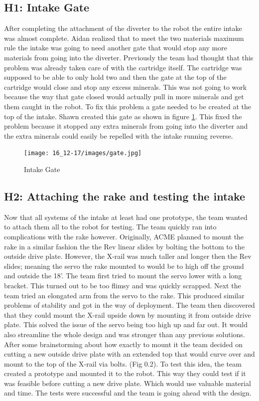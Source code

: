 \documentclass{article}
\begin{document}
\subsection{H1: Intake Gate}

After completing the attachment of the diverter to the robot the entire intake was almost complete. Aidan realized that to meet the two materials maximum rule the intake was going to need another gate that would stop any more materials from going into the diverter. Previously the team had thought that this problem was already taken care of with the cartridge itself. The cartridge was supposed to be able to only hold two and then the gate at the top of the cartridge would close and stop any excess minerals. This was not going to work because the way that gate closed would actually pull in more minerals and get them caught in the robot. To fix this problem a gate needed to be created at the top of the intake. Shawn created this gate as shown in figure \ref{fig:gate}. This fixed the problem because it stopped any extra minerals from going into the diverter and the extra minerals could easily be repelled with the intake running reverse.

\begin{figure}
    \centering
    \texttt{[image: 16\_12-17/images/gate.jpg]}
    \caption{Intake Gate}
    \label{fig:gate}
\end{figure}

\subsection{H2: Attaching the rake and testing the intake}

Now that all systems of the intake at least had one prototype, the team wanted to attach them all to the robot for testing. The team quickly ran into complications with the rake however. Originally, ACME planned to mount the rake in a similar fashion the the Rev linear slides by bolting the bottom to the outside drive plate. However, the X-rail was much taller and longer then the Rev slides; meaning the servo the rake mounted to would be to high off the ground and outside the 18'. The team first tried to mount the servo lower with a long bracket. This turned out to be too flimsy and was quickly scrapped. Next the team tried an elongated arm from the servo to the rake. This produced similar problems of stability and got in the way of deployment. The team then discovered that they could mount the X-rail upside down by mounting it from outside drive plate. This solved the issue of the servo being too high up and far out. It would also streamline the whole design and was stronger than any previous solutions. After some brainstorming about how exactly to mount it the team decided on cutting a new outside drive plate with an extended top that would curve over and mount to the top of the X-rail via bolts. (Fig 0.2). To test this idea, the team created a prototype and mounted it to the robot. This way they could test if it was feasible before cutting a new drive plate. Which would use valuable material and time. The tests were successful and the team is going ahead with the design. 
\end{document}
